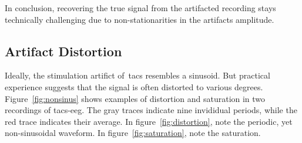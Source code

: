\documentclass[a4paper]{article}
\begin{document}
In conclusion, recovering the true signal from the artifacted recording stays technically challenging due to non-stationarities in the artifacts amplitude.

\subsection{Artifact Distortion}

Ideally, the stimulation artifict of~\gls{tacs} resembles a sinusoid. But practical experience suggests that the signal is often distorted to various degrees.
Figure~\ref{fig:nonsinus} shows examples of distortion and saturation in two recordings of \gls{tacs}-\gls{eeg}. The gray traces indicate nine invididual periods, while the red trace indicates their average. In figure~\ref{fig:distortion}, note the periodic, yet non-sinusoidal waveform. In figure~\ref{fig:saturation}, note the saturation.
\end{document}
